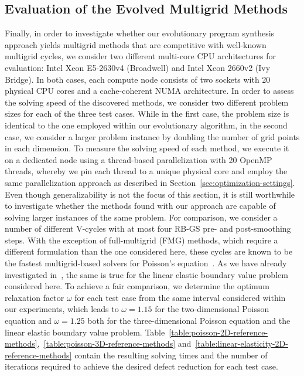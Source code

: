\subsection{Evaluation of the Evolved Multigrid Methods}
Finally, in order to investigate whether our evolutionary program synthesis approach yields multigrid methods that are competitive with well-known multigrid cycles, we consider two different multi-core CPU architectures for evaluation: Intel Xeon E5-2630v4 (Broadwell) and Intel Xeon 2660v2 (Ivy Bridge).
In both cases, each compute node consists of two sockets with 20 physical CPU cores and a cache-coherent NUMA architecture.
In order to assess the solving speed of the discovered methods, we consider two different problem sizes for each of the three test cases.
While in the first case, the problem size is identical to the one employed within our evolutionary algorithm, in the second case, we consider a larger problem instance by doubling the number of grid points in each dimension.
To measure the solving speed of each method, we execute it on a dedicated node using a thread-based parallelization with 20 OpenMP threads, whereby we pin each thread to a unique physical core and employ the same parallelization approach as described in Section~\ref{sec:optimization-settings}.
Even though generalizability is not the focus of this section, it is still worthwhile to investigate whether the methods found with our approach are capable of solving larger instances of the same problem.
For comparison, we consider a number of different V-cycles with at most four RB-GS pre- and post-smoothing steps.
With the exception of full-multigrid (FMG) methods, which require a different formulation than the one considered here, these cycles are known to be the fastest multigrid-based solvers for Poisson's equation~\cite{trottenberg2000multigrid}.
As we have already investigated in~\cite{schmitt2020constructing}, the same is true for the linear elastic boundary value problem considered here.
To achieve a fair comparison, we determine the optimum relaxation factor $\omega$ for each test case from the same interval considered within our experiments, which leads to $\omega = 1.15$ for the two-dimensional Poisson equation and $\omega = 1.25$ both for the three-dimensional Poisson equation and the linear elastic boundary value problem.
Table~\ref{table:poisson-2D-reference-methods},~\ref{table:poisson-3D-reference-methods} and~\ref{table:linear-elasticity-2D-reference-methods} contain the resulting solving times and the number of iterations required to achieve the desired defect reduction for each test case.
